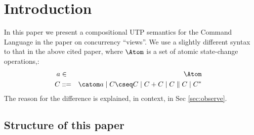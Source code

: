 \section{Introduction}\label{sec:Intro}

In this paper we present a compositional UTP semantics
for the Command Language in the paper
on concurrency ``views''\cite{conf/popl/Dinsdale-YoungBGPY13}.
We use a slightly different syntax to that in the above cited paper,
where $\Atom$ is a set of atomic state-change operations,:
\begin{eqnarray*}
   a &\in& \Atom
\\ C &::=& \catom a \mid C \cseq C \mid C+C \mid C \parallel C \mid C^*
\end{eqnarray*}
The reason for the difference is explained, in context, in Sec \ref{sec:observe}.





\subsection{Structure of this paper}
